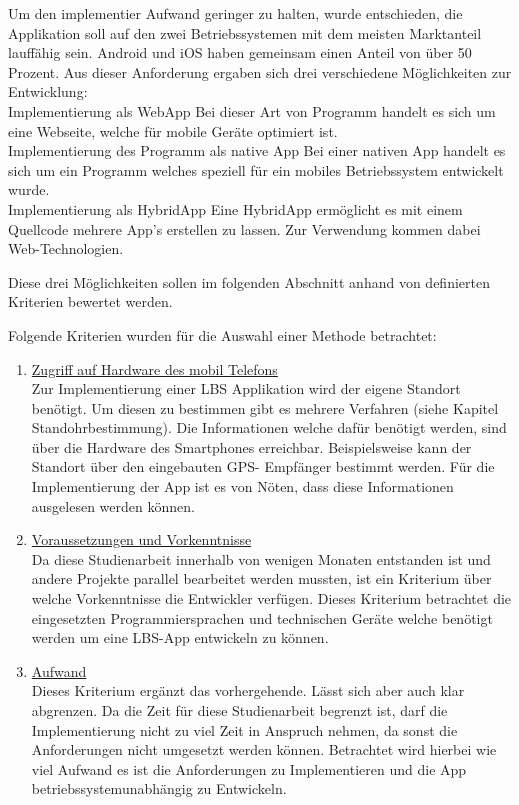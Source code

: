 Um den implementier Aufwand geringer zu halten, wurde entschieden, die Applikation 
soll auf den zwei Betriebssystemen mit dem meisten Marktanteil lauffähig sein. 
Android und iOS haben gemeinsam einen Anteil von über 50 Prozent. Aus dieser 
Anforderung ergaben sich drei verschiedene Möglichkeiten zur Entwicklung:
\\Implementierung als WebApp
Bei dieser Art von Programm handelt es sich um eine Webseite, welche für mobile 
Geräte optimiert ist.
\\Implementierung des Programm als native App
Bei einer nativen App handelt es sich um ein Programm welches speziell für ein mobiles Betriebssystem entwickelt wurde.
\\Implementierung als HybridApp
Eine HybridApp ermöglicht es mit einem Quellcode mehrere App's erstellen zu lassen. 
Zur Verwendung kommen dabei Web-Technologien.

Diese drei Möglichkeiten sollen im folgenden Abschnitt anhand von definierten 
Kriterien bewertet werden.


Folgende Kriterien wurden für die Auswahl einer Methode betrachtet:
\begin{enumerate}
\item \underline{Zugriff auf Hardware des mobil Telefons}
\\Zur Implementierung einer LBS Applikation wird der eigene Standort benötigt. Um 
diesen zu bestimmen gibt es mehrere Verfahren (siehe Kapitel Standohrbestimmung). 
Die Informationen welche dafür benötigt werden, sind über die Hardware des 
Smartphones erreichbar. Beispielsweise kann der Standort über den eingebauten GPS-
Empfänger bestimmt werden. Für die Implementierung der App ist es von Nöten, dass 
diese Informationen ausgelesen werden können.

\item \underline{Voraussetzungen und Vorkenntnisse}
\\Da diese Studienarbeit innerhalb von wenigen Monaten entstanden ist und andere Projekte 
parallel bearbeitet werden mussten, ist ein Kriterium über welche Vorkenntnisse die 
Entwickler verfügen. Dieses Kriterium betrachtet die eingesetzten 
Programmiersprachen und technischen Geräte welche benötigt werden um eine LBS-App 
entwickeln zu können.


\item \underline{Aufwand}
\\Dieses Kriterium ergänzt das vorhergehende. Lässt sich aber auch klar abgrenzen. Da 
die Zeit für diese Studienarbeit begrenzt ist, darf die Implementierung nicht zu 
viel Zeit in Anspruch nehmen, da sonst die Anforderungen nicht umgesetzt werden 
können. Betrachtet wird hierbei wie viel Aufwand es ist die Anforderungen zu 
Implementieren und die App betriebssystemunabhängig zu Entwickeln.
\end{enumerate}

